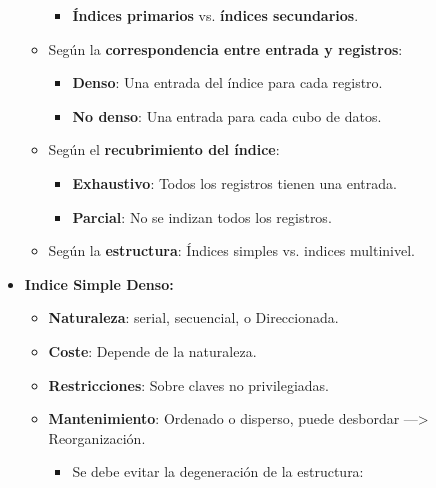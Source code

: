 \documentclass[12pt, twoside, openright]{report} %
\begin{document}
\begin{itemize}
\begin{itemize}
      \begin{itemize}
      \item \textbf{Índices primarios} vs. \textbf{índices secundarios}.
        
      \end{itemize}
    \item Según la \textbf{correspondencia entre entrada y registros}:
      

      \begin{itemize}
      \item \textbf{Denso}: Una entrada del índice para cada registro.
        
      \item \textbf{No denso}: Una entrada para cada cubo de datos.
        
      \end{itemize}
    \item Según el \textbf{recubrimiento del índice}:
      

      \begin{itemize}
      \item \textbf{Exhaustivo}: Todos los registros tienen una entrada.
        
      \item \textbf{Parcial}: No se indizan todos los registros.
        
      \end{itemize}
    \item Según la \textbf{estructura}: Índices simples vs. indices
      multinivel.
      
    \end{itemize}
	\pagebreak
  \item \textbf{Indice Simple Denso:}
    

    \begin{itemize}
    \item \textbf{Naturaleza}: serial, secuencial, o Direccionada.
      
    \item \textbf{Coste}: Depende de la naturaleza.
      
    \item \textbf{Restricciones}: Sobre claves no privilegiadas.
      
    \item \textbf{Mantenimiento}: Ordenado o disperso, puede desbordar
      ---\textgreater{} Reorganización.
      

      \begin{itemize}
      \item Se debe evitar la degeneración de la estructura:
        


\end{itemize}
\end{itemize}
\end{itemize}
\end{document}
